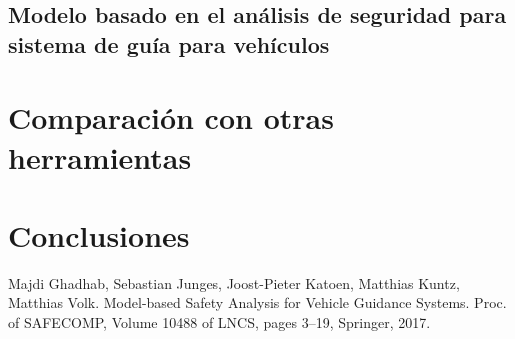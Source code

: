 \documentclass[11pt]{article}
\begin{document}
\subsection{Modelo basado en el an\'alisis de seguridad para sistema de gu\'ia para veh\'iculos}

\section{Comparaci\'on con otras herramientas}

\section{Conclusiones}

\begin{thebibliography}{99}
	 Majdi Ghadhab, Sebastian Junges, Joost-Pieter Katoen, Matthias Kuntz, Matthias Volk. Model-based Safety Analysis for Vehicle Guidance Systems. Proc. of SAFECOMP, Volume 10488 of LNCS, pages 3–19, Springer, 2017.
\end{thebibliography}
\end{document}
